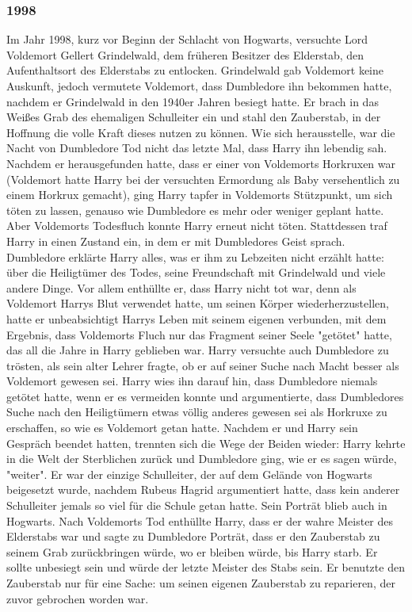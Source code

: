 \documentclass[a4paper, 10pt]{article}
\begin{document}
\subsubsection*{1998}
Im Jahr 1998, kurz vor Beginn der Schlacht von Hogwarts, versuchte Lord Voldemort Gellert Grindelwald, dem früheren Besitzer des Elderstab, den Aufenthaltsort des Elderstabs zu entlocken. Grindelwald gab Voldemort keine Auskunft, jedoch vermutete Voldemort, dass Dumbledore ihn bekommen hatte, nachdem er Grindelwald in den 1940er Jahren besiegt hatte. Er brach in das Weißes Grab des ehemaligen Schulleiter ein und stahl den Zauberstab, in der Hoffnung die volle Kraft dieses nutzen zu können.
\vspace{10pt}
\newline
{}  
Wie sich herausstelle, war die Nacht von Dumbledore Tod nicht das letzte Mal, dass Harry ihn lebendig sah. Nachdem er herausgefunden hatte, dass er einer von Voldemorts Horkruxen war (Voldemort hatte Harry bei der versuchten Ermordung als Baby versehentlich zu einem Horkrux gemacht), ging Harry tapfer in Voldemorts Stützpunkt, um sich töten zu lassen, genauso wie
Dumbledore es mehr oder weniger geplant hatte. Aber Voldemorts Todesfluch konnte Harry erneut nicht töten. Stattdessen traf Harry in einen Zustand ein, in dem er mit Dumbledores Geist sprach. Dumbledore erklärte Harry alles, was er ihm zu Lebzeiten nicht erzählt hatte: über die Heiligtümer des Todes, seine Freundschaft mit Grindelwald und viele andere Dinge.
\vspace{10pt}
\newline
{}  
Vor allem enthüllte er, dass Harry nicht tot war, denn als Voldemort Harrys Blut verwendet hatte, um seinen Körper wiederherzustellen, hatte er unbeabsichtigt Harrys Leben mit seinem eigenen verbunden, mit dem Ergebnis, dass Voldemorts Fluch nur das Fragment seiner Seele "getötet" hatte, das all die Jahre in Harry geblieben war. Harry versuchte auch Dumbledore zu trösten, als sein alter Lehrer fragte, ob er auf seiner Suche nach Macht besser als Voldemort gewesen sei. Harry wies ihn darauf hin, dass Dumbledore niemals getötet hatte, wenn er es vermeiden konnte und argumentierte, dass Dumbledores Suche nach den Heiligtümern etwas völlig anderes gewesen sei als Horkruxe zu erschaffen, so wie es Voldemort getan hatte.
\vspace{10pt}
\newline
{}  
Nachdem er und Harry sein Gespräch beendet hatten, trennten sich die Wege der Beiden wieder: Harry kehrte in die Welt der Sterblichen zurück und Dumbledore ging, wie er es sagen würde, "weiter". Er war der einzige Schulleiter, der auf dem Gelände von Hogwarts beigesetzt wurde, nachdem Rubeus Hagrid argumentiert hatte, dass kein anderer Schulleiter jemals so viel für die Schule getan hatte. Sein Porträt blieb auch in Hogwarts. Nach Voldemorts Tod enthüllte Harry, dass er der wahre Meister des Elderstabs war und sagte zu Dumbledore Porträt, dass er den Zauberstab zu seinem Grab zurückbringen würde, wo er bleiben würde, bis Harry starb. Er sollte unbesiegt sein und würde der letzte Meister des Stabs sein. Er benutzte den Zauberstab nur für eine Sache: um seinen eigenen Zauberstab zu reparieren, der zuvor gebrochen worden war.
\end{document}
